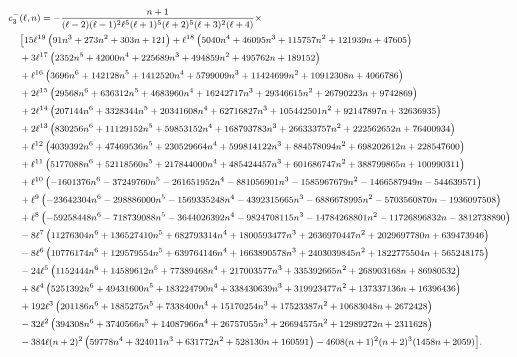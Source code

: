 \documentclass[11pt]{article}
\numberwithin{equation}{section}
\begin{document}
\begin{equation}\footnotesize
\begin{aligned}
c_3^-&(\ell,n)=-\frac{n+1}{(\ell-2) (\ell-1)^2 \ell^5 (\ell+1)^5 (\ell+2)^5 (\ell+3)^2 (\ell+4)}\times\\
&\bigl[15 \ell^{19} \left(91 n^3+273 n^2+303 n+121\right)+\ell^{18} \left(5040 n^4+46095 n^3+115757 n^2+121939 n+47605\right)\\
&+3 \ell^{17} \left(2352 n^5+42000 n^4+225689 n^3+494859 n^2+495762 n+189152\right)\\
&+\ell^{16} \left(3696 n^6+142128 n^5+1412520 n^4+5799009 n^3+11424699 n^2+10912308 n+4066786\right)\\
&+2 \ell^{15} \left(29568 n^6+636312 n^5+4683960 n^4+16242717 n^3+29346615 n^2+26790223 n+9742869\right)\\
&+2 \ell^{14} \left(207144 n^6+3328344 n^5+20341608 n^4+62716827 n^3+105442501 n^2+92147897 n+32636935\right)\\
&+2 \ell^{13} \left(830256 n^6+11129152 n^5+59853152 n^4+168793783 n^3+266333757 n^2+222562652 n+76400934\right)\\
&+\ell^{12} \left(4039392 n^6+47469536 n^5+230529664 n^4+599814122 n^3+884578094 n^2+698202612 n+228547600\right)\\
&+\ell^{11} \left(5177088 n^6+52118560 n^5+217844000 n^4+485424457 n^3+601686747 n^2+388799865 n+100990311\right)\\
&+\ell^{10} \left(-1601376 n^6-37249760 n^5-261651952 n^4-881056901 n^3-1585967679 n^2-1466587949 n-544639571\right)\\
&+\ell^9 \left(-23642304 n^6-298886000 n^5-1569335248 n^4-4392315665 n^3-6886678995 n^2-5703560870 n-1936097508\right)\\
&+\ell^8 \left(-59258448 n^6-718739088 n^5-3644026392 n^4-9824708115 n^3-14784268801 n^2-11726896832 n-3812738890\right)\\
&-8 \ell^7 \left(11276304 n^6+136527410 n^5+682793314 n^4+1800593477 n^3+2636970447 n^2+2029697780 n+639473946\right)\\
&-8 \ell^6 \left(10776174 n^6+129579554 n^5+639764146 n^4+1663890578 n^3+2403039845 n^2+1822775504 n+565248175\right)\\
&-24 \ell^5 \left(1152444 n^6+14589612 n^5+77389468 n^4+217003577 n^3+335392665 n^2+268903168 n+86980532\right)\\
&+8 \ell^4 \left(5251392 n^6+49431600 n^5+183224790 n^4+338430639 n^3+319923477 n^2+137337136 n+16396436\right)\\
&+192 \ell^3 \left(201186 n^6+1885275 n^5+7338400 n^4+15170254 n^3+17523387 n^2+10683048 n+2672428\right)\\
&-32 \ell^2 \left(394308 n^6+3740566 n^5+14087966 n^4+26757055 n^3+26694575 n^2+12989272 n+2311628\right)\\
&-384 \ell (n+2)^2 \left(59778 n^4+324011 n^3+631772 n^2+528130 n+160591\right)-4608 (n+1)^2 (n+2)^3 (1458 n+2059)\bigr].
\end{aligned}
\end{equation}



 
 
 
\end{document}
